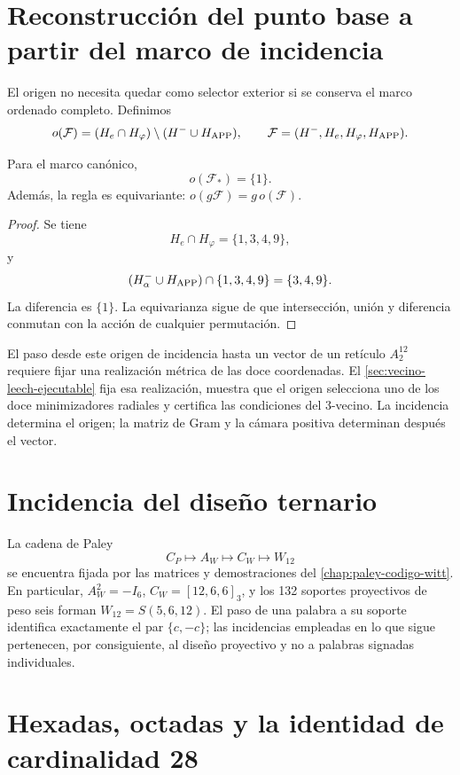 \section{Reconstrucción del punto base a partir del marco de incidencia}

El origen no necesita quedar como selector exterior si se conserva el marco
ordenado completo. Definimos
\[
o(\mathcal F)
=(H_e\cap H_\varphi)\setminus(H^-\cup H_{\rm APP}),
\qquad
\mathcal F=(H^-,H_e,H_\varphi,H_{\rm APP}).
\]

\begin{theorem}
Para el marco canónico,
\[
o(\mathcal F_*)=\{1\}.
\]
Además, la regla es equivariante: \(o(g\mathcal F)=g\,o(\mathcal F)\).
\end{theorem}

\begin{proof}
Se tiene
\[
H_e\cap H_\varphi=\{1,3,4,9\},
\]
y
\[
(H^-_\alpha\cup H_{\rm APP})\cap\{1,3,4,9\}
=\{3,4,9\}.
\]
La diferencia es \(\{1\}\). La equivarianza sigue de que intersección,
unión y diferencia conmutan con la acción de cualquier permutación.
\end{proof}

El paso desde este origen de incidencia hasta un vector de un retículo
\(A_2^{12}\) requiere fijar una realización métrica de las doce coordenadas.
El \cref{sec:vecino-leech-ejecutable} fija esa realización, muestra
que el origen selecciona uno de los doce minimizadores radiales y certifica
las condiciones del 3-vecino. La incidencia determina el origen; la matriz de
Gram y la cámara positiva determinan después el vector.

\section{Incidencia del diseño ternario}

La cadena de Paley
\[
C_P\longmapsto A_W\longmapsto C_W\longmapsto W_{12}
\]
se encuentra fijada por las matrices y demostraciones del
\cref{chap:paley-codigo-witt}. En particular,
\(A_W^2=-I_6\), \(C_W=[12,6,6]_3\), y los 132 soportes proyectivos de
peso seis forman \(W_{12}=S(5,6,12)\). El paso de una palabra a su soporte
identifica exactamente el par \(\{c,-c\}\); las incidencias empleadas en lo
que sigue pertenecen, por consiguiente, al diseño proyectivo y no a palabras
signadas individuales.

\section{Hexadas, octadas y la identidad de cardinalidad 28}


